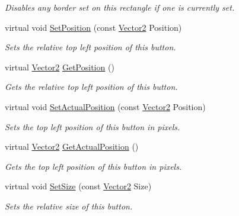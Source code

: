 \begin{DoxyCompactItemize}
\begin{DoxyCompactList}\small\item\em Disables any border set on this rectangle if one is currently set. \item\end{DoxyCompactList}\item 
virtual void \hyperlink{classphys_1_1UI_1_1Button_a9bfcd08b027c80130dd2c7e6af119da5}{SetPosition} (const \hyperlink{classphys_1_1Vector2}{Vector2} Position)
\begin{DoxyCompactList}\small\item\em Sets the relative top left position of this button. \item\end{DoxyCompactList}\item 
virtual \hyperlink{classphys_1_1Vector2}{Vector2} \hyperlink{classphys_1_1UI_1_1Button_adfa08ace813b88cae114e18f88942642}{GetPosition} ()
\begin{DoxyCompactList}\small\item\em Gets the relative top left position of this button. \item\end{DoxyCompactList}\item 
virtual void \hyperlink{classphys_1_1UI_1_1Button_ad5ad1d5f72f52750c3211e7b812237a8}{SetActualPosition} (const \hyperlink{classphys_1_1Vector2}{Vector2} Position)
\begin{DoxyCompactList}\small\item\em Sets the top left position of this button in pixels. \item\end{DoxyCompactList}\item 
virtual \hyperlink{classphys_1_1Vector2}{Vector2} \hyperlink{classphys_1_1UI_1_1Button_a0b991ada87707d8d951dae7c0e3246f6}{GetActualPosition} ()
\begin{DoxyCompactList}\small\item\em Gets the top left position of this button in pixels. \item\end{DoxyCompactList}\item 
virtual void \hyperlink{classphys_1_1UI_1_1Button_a06e6526a15b3f8bb6e63c70ac7b02134}{SetSize} (const \hyperlink{classphys_1_1Vector2}{Vector2} Size)
\begin{DoxyCompactList}\small\item\em Sets the relative size of this button. \item\end{DoxyCompactList}\item 

\end{DoxyCompactItemize}
